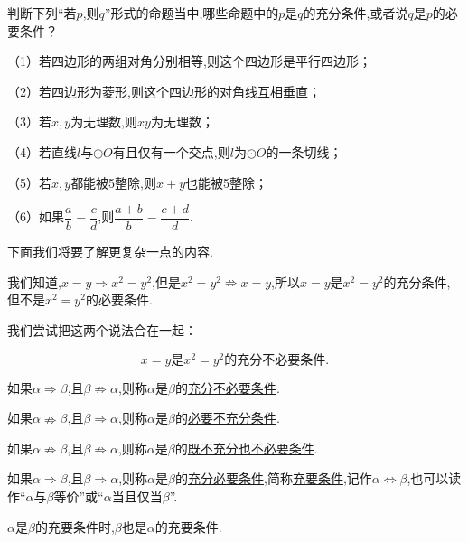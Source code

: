 \documentclass[lang=cn,math=cm,chinesefont=nofont,11pt,scheme=chinese,twocol]{elegantbook}
\begin{document}
\begin{exercise}\label{202406262101}
  判断下列“若$p$,则$q$”形式的命题当中,哪些命题中的$p$是$q$的充分条件,或者说$q$是$p$的必要条件？

  （1）若四边形的两组对角分别相等,则这个四边形是平行四边形；

  （2）若四边形为菱形,则这个四边形的对角线互相垂直；

  （3）若$x,y$为无理数,则$xy$为无理数；

  （4）若直线$l$与$\odot O$有且仅有一个交点,则$l$为$\odot O$的一条切线；

  （5）若$x,y$都能被5整除,则$x+y$也能被5整除；

  \begin{spacing}{2.0}
    （6）如果$\dfrac{a}{b}=\dfrac{c}{d}$,则$\dfrac{a+b}{b}=\dfrac{c+d}{d}$.
  \end{spacing}
\end{exercise}

\hspace*{\fill}

下面我们将要了解更复杂一点的内容.

我们知道,$x=y\Rightarrow x^2=y^2$,但是$x^2=y^2\nRightarrow x=y$,所以$x=y$是$x^2=y^2$的充分条件,但不是$x^2=y^2$的必要条件.

我们尝试把这两个说法合在一起：

$$x=y\text{是}x^2=y^2\text{的}\textbf{充分不必要条件.}$$

\begin{definition}
  如果$\alpha\Rightarrow\beta$,且$\beta\nRightarrow\alpha$,则称$\alpha$是$\beta$的\underline{充分不必要条件}.

  如果$\alpha\nRightarrow\beta$,且$\beta\Rightarrow\alpha$,则称$\alpha$是$\beta$的\underline{必要不充分条件}.

  如果$\alpha\nRightarrow\beta$,且$\beta\nRightarrow\alpha$,则称$\alpha$是$\beta$的\underline{既不充分也不必要条件}.

  如果$\alpha\Rightarrow\beta$,且$\beta\Rightarrow\alpha$,则称$\alpha$是$\beta$的\underline{充分必要条件},简称\underline{充要条件},记作$\alpha\Leftrightarrow\beta$,也可以读作“$\alpha$与$\beta$等价”或“$\alpha$当且仅当$\beta$”.
\end{definition}

\begin{remark}
  $\alpha$是$\beta$的充要条件时,$\beta$也是$\alpha$的充要条件.
\end{remark}

\hspace*{\fill}
\end{document}
